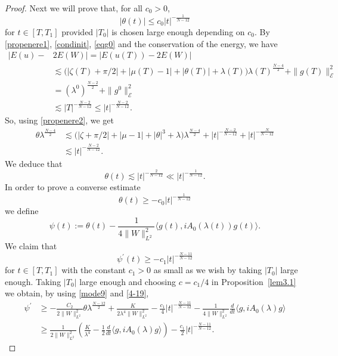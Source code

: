 \documentclass[10pt,a4paper]{amsart}
\begin{document}
\begin{proof}
Next we will prove that, for all $c_0>0$,
\begin{equation}\label{(4-18)}
|\theta(t)|\le c_0|t|^{-\frac{1}{N-12}}
\end{equation}
for $t\in [T,T_1]$ provided $|T_0|$ is chosen large enough depending on $c_0$.
By \eqref{propenere1}, \eqref{condinit}, \eqref{eqg0} and the conservation of the energy, we have
\begin{align*}
|E(u)- &2E(W)|=|E(u(T))-2E(W)|\\
&\lesssim \big(|\zeta (T) +\pi /2| +|\mu (T) -1| +|\theta (T)| +\lambda (T) \big)\lambda (T)^{\frac{N-4}{2}} +\|g(T)\|_{\mathcal{E}}^2\\
&=(\lambda^0)^{\frac{N-2}{2}}+\|g^0\|_{\mathcal{E}}^2\\
&\lesssim |T|^{-\frac{N-2}{N-12}} \le |t|^{-\frac{N-2}{N-12}}.
\end{align*}
So, using \eqref{propenere2}, we get
\begin{align*}
\theta \lambda^{\frac{N-4}{2}}& \lesssim \big(|\zeta +\pi/2|+|\mu -1| +|\theta|^3 +\lambda\big) \lambda^{\frac{N-4}{2}}
+|t|^{-\frac{N-2}{N-12}}+|t|^{-\frac{N}{N-12}}\\
&\lesssim |t|^{-\frac{N-2}{N-12}}.
\end{align*}
We deduce that
\begin{equation}\label{4-19}
\theta(t) \lesssim |t|^{-\frac{2}{N-12}}
\ll |t|^{-\frac{1}{N-12}}.
\end{equation}
In order to prove a converse estimate
\begin{equation}\label{4-20}
\theta(t)\ge -c_0|t|^{-\frac{1}{N-12}}
\end{equation}
we define
\[
\psi(t):=\theta (t) - \dfrac{1}{4\|W\|_{L^2}^2} \langle g(t), i A_0 (\lambda (t)) g(t)\rangle.
\]
We claim that 
\begin{equation}\label{4-21}
\psi^\prime (t)\ge -c_1|t|^{-\frac{N-11}{N-12}}
\end{equation}
for $t\in [T,T_1]$ with the constant $c_1>0$ as small as we wish by taking $|T_0|$ large enough.
Taking $|T_0|$ large enough and choosing $c=c_1/4$ in Proposition~\ref{lem3.1} we obtain, by using \eqref{mode9} and \eqref{4-19}, 
\begin{align}\label{4-22}
\psi^\prime &\geq 
-\frac{C_2}{2\|W\|_{L^2}^2}\theta\lambda^{\frac{N-12}{2}}
+\frac{K}{2\lambda^4 \|W\|_{L^2}^2} -\frac{c_1}{4}|t|^{-\frac{N-11}{N-12}} -\frac{1}{4\|W\|_{L^2}^2}\frac{d}{dt} \langle g, i A_0 (\lambda) g\rangle \nonumber\\
&\geq \frac{1}{2\|W\|_{L^2}^2} \left(\frac{K}{\lambda^4} - \frac{1}{2} \frac{d}{dt} \langle g, iA_0 (\lambda ) g \rangle \right) - \frac{c_1}{2}|t|^{-\frac{N-11}{N-12}}.

\end{align}
\end{proof}
\end{document}
